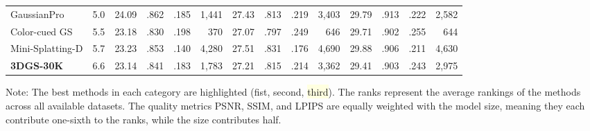 {\begin{minipage}{\textheight}
\begin{adjustbox}{center}
\begin{tabular}{ll|lrrr|lrrr|lrrr}
GaussianPro & 5.0 & \cellcolor{lightorange}24.09 & \cellcolor{lightorange}.862 & .185 & 1,441 & 27.43 & .813 & .219 & 3,403 & 29.79 & \cellcolor{lightred}.913 & \cellcolor{lightorange}.222 & 2,582 \\
Color-cued GS & 5.5 & 23.18 & .830 & .198 & \cellcolor{lightyellow}370 & 27.07 & .797 & .249 & \cellcolor{lightyellow}646 & 29.71 & .902 & .255 & 644 \\
Mini-Splatting-D & 5.7 & 23.23 & \cellcolor{lightyellow}.853 & \cellcolor{lightred}.140 & 4,280 & \cellcolor{lightyellow}27.51 & \cellcolor{lightred}.831 & \cellcolor{lightred}.176 & 4,690 & 29.88 & .906 & \cellcolor{lightred}.211 & 4,630 \\
\textbf{3DGS-30K} & 6.6 & 23.14 & .841 & .183 & 1,783 & 27.21 & .815 & .214 & 3,362 & 29.41 & .903 & .243 & 2,975 \\
\bottomrule
\end{tabular}
        \end{adjustbox}
        \newline\newline
        \noindent Note: The best methods in each category are highlighted (\colorbox{lightred}{fist}, \colorbox{lightorange}{second}, \colorbox{lightyellow}{third}). The ranks represent the average rankings of the methods across all available datasets. The quality metrics PSNR, SSIM, and LPIPS are equally weighted with the model size, meaning they each contribute one-sixth to the ranks, while the size contributes half.

    \end{minipage}
}